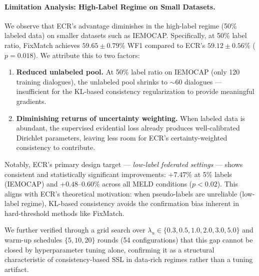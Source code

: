 
\paragraph{Limitation Analysis: High-Label Regime on Small Datasets.}
We observe that ECR's advantage diminishes in the high-label regime (50\% labeled data) 
on smaller datasets such as IEMOCAP. Specifically, at 50\% label ratio, FixMatch achieves 
$59.65 \pm 0.79\%$ WF1 compared to ECR's $59.12 \pm 0.56\%$ ($p = 0.018$). We attribute 
this to two factors:

\begin{enumerate}
    \item \textbf{Reduced unlabeled pool.} At 50\% label ratio on IEMOCAP (only 120 training 
    dialogues), the unlabeled pool shrinks to $\sim$60 dialogues — insufficient for the 
    KL-based consistency regularization to provide meaningful gradients.
    
    \item \textbf{Diminishing returns of uncertainty weighting.} When labeled data is abundant, 
    the supervised evidential loss already produces well-calibrated Dirichlet parameters, 
    leaving less room for ECR's certainty-weighted consistency to contribute.
\end{enumerate}

Notably, ECR's primary design target — \textit{low-label federated settings} — shows 
consistent and statistically significant improvements: $+7.47\%$ at 5\% labels 
(IEMOCAP) and $+0.48$--$0.60\%$ across all MELD conditions ($p < 0.02$). This aligns 
with ECR's theoretical motivation: when pseudo-labels are unreliable (low-label regime), 
KL-based consistency avoids the confirmation bias inherent in hard-threshold methods 
like FixMatch.

We further verified through a grid search over $\lambda_u \in \{0.3, 0.5, 1.0, 2.0, 3.0, 5.0\}$ 
and warm-up schedules $\{5, 10, 20\}$ rounds (54 configurations) that this gap cannot be 
closed by hyperparameter tuning alone, confirming it as a structural characteristic of 
consistency-based SSL in data-rich regimes rather than a tuning artifact.
